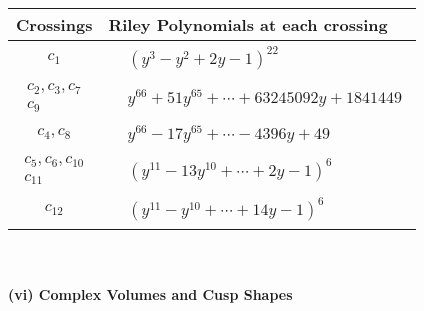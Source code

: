 \documentclass[1p]{elsarticle_modified}
\theoremstyle{definition}
\begin{document}
\begin{tabular}{m{50pt}|m{274pt}}
Crossings & \hspace{64pt}Riley Polynomials at each crossing \\
\hline $$\begin{aligned}c_{1}\end{aligned}$$&$\begin{aligned}
&(y^3- y^2+2 y-1)^{22}
\end{aligned}$\\
\hline $$\begin{aligned}c_{2},c_{3},c_{7}\\c_{9}\end{aligned}$$&$\begin{aligned}
&y^{66}+51 y^{65}+\cdots+63245092 y+1841449
\end{aligned}$\\
\hline $$\begin{aligned}c_{4},c_{8}\end{aligned}$$&$\begin{aligned}
&y^{66}-17 y^{65}+\cdots-4396 y+49
\end{aligned}$\\
\hline $$\begin{aligned}c_{5},c_{6},c_{10}\\c_{11}\end{aligned}$$&$\begin{aligned}
&(y^{11}-13 y^{10}+\cdots+2 y-1)^{6}
\end{aligned}$\\
\hline $$\begin{aligned}c_{12}\end{aligned}$$&$\begin{aligned}
&(y^{11}- y^{10}+\cdots+14 y-1)^{6}
\end{aligned}$\\
\hline
\end{tabular}\\~\\
\newpage\flushleft \textbf{(vi) Complex Volumes and Cusp Shapes}
\end{document}
